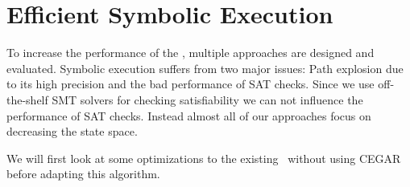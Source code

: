 \chapter{Efficient Symbolic Execution}

To increase the performance of the \symbolicExecutionCPA, multiple approaches are designed and evaluated.
Symbolic execution suffers from two major issues:
Path explosion due to its high precision and the bad performance of SAT checks.
Since we use off-the-shelf SMT solvers for checking satisfiability we can not influence the performance of SAT checks.
Instead almost all of our approaches focus on decreasing the state space.

We will first look at some optimizations to the existing \symbolicExecutionCPA\ without using CEGAR before adapting this algorithm.





